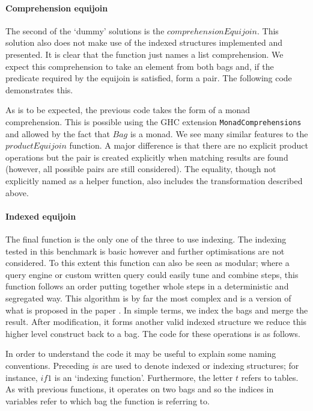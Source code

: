 \paragraph{Comprehension equijoin} The second of the `dummy' solutions is the
$comprehensionEquijoin$.
This solution also does not make use of the indexed structures implemented and
presented. It is
clear that the function just names a list comprehension. We expect this
comprehension to take an element from both bags and, if the predicate required
by the equijoin is satisfied, form a pair. The following code demonstrates
this.



\noindent
As is to be expected, the previous code takes the form of a monad comprehension.
This is possible using the GHC extension \verb|MonadComprehensions| and allowed by
the fact that $Bag$ is a monad. We see many similar
features to the $productEquijoin$ function. A major difference is that there are
no explicit product operations but the pair is created explicitly when matching
results are found (however, all possible pairs are still considered). The equality, though
not explicitly named as a helper function, also includes the transformation described above.

\paragraph{Indexed equijoin} The final function is the only one of the three to use
indexing. The indexing tested in this benchmark is basic however and further
optimisations are not considered. To this extent this function can also be seen as
modular; where a query engine or
custom written query could easily tune and combine steps, this function follows an
order putting together whole steps in a deterministic and segregated way.
This algorithm is by far
the most complex and is a version of what is proposed in the paper \relalg{}. In
simple terms, we index the bags and merge the result. After modification, it
forms another valid indexed
structure we reduce this higher level construct back to a bag. The code for
these operations is as follows.



\noindent
In order to understand the code it may be useful to explain some naming
conventions. Preceding $i$s are used to denote indexed or indexing structures;
for instance, $if1$ is an `indexing function'. Furthermore, the letter $t$
refers to tables. As with previous functions, it operates on two bags and
so the indices in variables refer to which bag the function is referring to.

